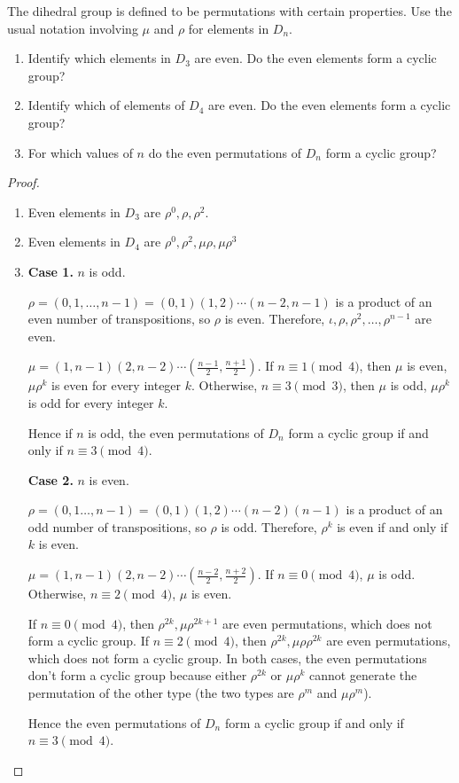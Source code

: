\newpage
\begin{exercise}
    The dihedral group is defined to be permutations with certain properties. Use the usual notation involving $\mu$ and $\rho$ for elements in $D_{n}$.
    \begin{enumerate}[label={\textbf{\alph*.}}]
        \item Identify which elements in $D_{3}$ are even. Do the even elements form a cyclic group?
        \item Identify which of elements of $D_{4}$ are even. Do the even elements form a cyclic group?
        \item For which values of $n$ do the even permutations of $D_{n}$ form a cyclic group?
    \end{enumerate}
\end{exercise}

\begin{proof}
    \begin{enumerate}[label={\textbf{\alph*.}}]
        \item Even elements in $D_{3}$ are $\rho^{0}, \rho, \rho^{2}$.
        \item Even elements in $D_{4}$ are $\rho^{0}, \rho^{2}, \mu\rho, \mu\rho^{3}$
        \item \textbf{Case 1.} $n$ is odd.

              $\rho = (0,1,\ldots,n-1) = (0,1)(1,2)\cdots(n-2,n-1)$ is a product of an even number of transpositions, so $\rho$ is even. Therefore, $\iota, \rho, \rho^{2}, \ldots, \rho^{n-1}$ are even.

              $\mu = (1,n-1)(2,n-2)\cdots (\frac{n-1}{2},\frac{n+1}{2})$. If $n\equiv 1\pmod{4}$, then $\mu$ is even, $\mu\rho^{k}$ is even for every integer $k$. Otherwise, $n\equiv 3\pmod{3}$, then $\mu$ is odd, $\mu\rho^{k}$ is odd for every integer $k$.

              Hence if $n$ is odd, the even permutations of $D_{n}$ form a cyclic group if and only if $n\equiv 3\pmod{4}$.

              \textbf{Case 2.} $n$ is even.

              $\rho = (0,1\ldots,n-1) = (0,1)(1,2)\cdots (n-2)(n-1)$ is a product of an odd number of transpositions, so $\rho$ is odd. Therefore, $\rho^{k}$ is even if and only if $k$ is even.

              $\mu = (1,n-1)(2,n-2)\cdots(\frac{n-2}{2},\frac{n+2}{2})$. If $n\equiv 0\pmod{4}$, $\mu$ is odd. Otherwise, $n\equiv 2\pmod{4}$, $\mu$ is even.

              If $n\equiv 0\pmod{4}$, then $\rho^{2k}, \mu\rho^{2k+1}$ are even permutations, which does not form a cyclic group. If $n\equiv 2\pmod{4}$, then $\rho^{2k}, \mu\rho\rho^{2k}$ are even permutations, which does not form a cyclic group. In both cases, the even permutations don't form a cyclic group because either $\rho^{2k}$ or $\mu\rho^{k}$ cannot generate the permutation of the other type (the two types are $\rho^{m}$ and $\mu\rho^{m}$).

              Hence the even permutations of $D_{n}$ form a cyclic group if and only if $n\equiv 3\pmod{4}$.
    \end{enumerate}
\end{proof}

